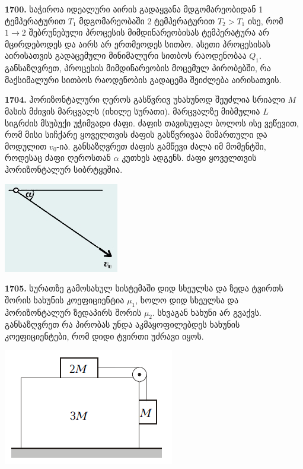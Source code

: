 \documentclass[12pt,a4paper,]{report}
\begin{document}
\textbf{1700.} საჭიროა იდეალური აირის გადაყვანა მდგომარეობიდან 1 ტემპერატურით $T_1$ მდგომარეობაში 2 ტემპერატურით $T_2>T_1$ ისე, რომ $1\rightarrow 2$ შებრუნებული პროცესის მიმდინარეობისას ტემპერატურა არ მცირდებოდეს და აირს არ ერთმეოდეს სითბო. ასეთი პროცესისას აირისათვის გადაცემული მინიმალური სითბოს რაოდენობაა $Q_1$. განსაზღვრეთ, პროცესის მიმდინარეობის მოცემულ პირობებში, რა მაქსიმალური სითბოს რაოდენობის გადაცემა შეიძლება აირისათვის.


\textbf{1704.} ჰორიზონტალური ღეროს გასწვრივ უხახუნოდ შეუძლია სრიალი $M$ მასის მძივის მარცვალს (იხილე სურათი). მარცვალზე მიბმულია $L$ სიგრძის მსუბუქი უჭიმვადი ძაფი. ძაფის თავისუფალ ბოლოს ისე ვეწევით, რომ მისი სიჩქარე ყოველთვის ძაფის გასწვრივაა მიმართული და მოდულით $v_0$-ია. განსაზღვრეთ ძაფის გამწევი ძალა იმ მომენტში, როდესაც ძაფი ღეროსთან $\alpha$ კუთხეს ადგენს.  ძაფი ყოველთვის ჰორიზონტალურ სიბრტყეშია.
		\begin{center}
			\includegraphics[scale=0.5]{images/F1704}
		\end{center}

\textbf{1705.} სურათზე გამოსახულ სისტემაში დიდ სხეულსა და ზედა ტვირთს შორის ხახუნის კოეფიციენტია $\mu_1$, ხოლო დიდ სხეულსა და ჰორიზონტალურ ზედაპირს შორის $\mu_2$. სხვაგან ხახუნი არ გვაქვს. განსაზღვრეთ რა პირობას უნდა აკმაყოფილებდეს ხახუნის კოეფიციენტები, რომ დიდი ტვირთი უძრავი იყოს.
		\begin{center}
			\includegraphics[scale=0.5]{images/F1705.png}
		\end{center}
\end{document}
